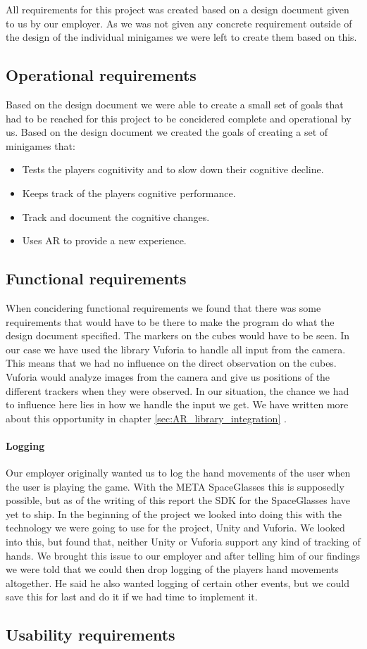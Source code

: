All requirements for this project was created based on a design document given to us by our employer.
As we was not given any concrete requirement outside of the design of the individual minigames we
were left to create them based on this.


\subsection{Operational requirements}
Based on the design document we were able to create a small set of goals that had to be reached for this project
to be concidered complete and operational by us.
Based on the design document we created the goals of creating a set of minigames that:
\begin{itemize}
	\item Tests the players cognitivity and to slow down their cognitive decline.
	\item Keeps track of the players cognitive performance.
	\item Track and document the cognitive changes.
	\item Uses AR to provide a new experience.
\end{itemize}

\subsection{Functional requirements}
When concidering functional requirements we found that there was some requirements that would have to be there to make the program do what the design document specified. 
The markers on the cubes would have to be seen. 
In our case we have used the library \gls{Vuforia} to handle all input from the camera.
This means that we had no influence on the direct observation on the cubes. 
Vuforia would analyze images from the camera and give us positions of the different trackers when they were observed. 
In our situation, the chance we had to influence here lies in how we handle the input we get. 
We have written more about this opportunity in chapter \ref{sec:AR_library_integration} .

\paragraph{Logging}
Our employer originally wanted us to log the hand movements of the user when the user is playing the game. 
With the META SpaceGlasses this is supposedly possible, but as of the writing of this report the SDK for the SpaceGlasses have yet to ship. 
In the beginning of the project we looked into doing this with the technology we were going to use for the project, Unity and Vuforia. 
We looked into this, but found that, neither Unity or Vuforia support any kind of tracking of hands. 
We brought this issue to our employer and after telling him of our findings we were told that we could then drop logging of the players hand movements altogether. 
He said he also wanted logging of certain other events, but we could save this for last and do it if we had time to implement it.

\subsection{Usability requirements}
